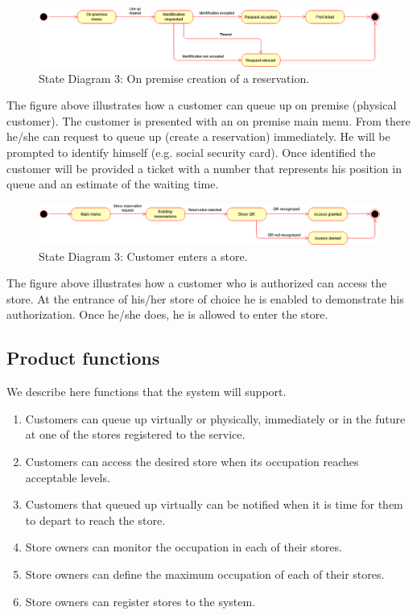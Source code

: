 \begin{figure}[!htb]
	\centering
	\includegraphics[width=\textwidth]{Images/StateDiagram3.png}
	\caption{State Diagram 3: On premise creation of a reservation.}
\end{figure}
The figure above illustrates how a customer can queue up on premise (physical customer). The customer is presented with an on premise main menu. From there he/she can request to queue up (create a reservation) immediately. He will be prompted to identify himself (e.g. social security card). Once identified the customer will be provided a ticket with a number that represents his position in queue and an estimate of the waiting time.

\begin{figure}[!htb]
	\centering
	\includegraphics[width=\textwidth]{Images/StateDiagram4.png}
	\caption{State Diagram 3: Customer enters a store.}
\end{figure}
The figure above illustrates how a customer who is authorized can access the store. At the entrance of his/her store of choice he is enabled to demonstrate his authorization. Once he/she does, he is allowed to enter the store.

\subsection{Product functions}
We describe here functions that the system will support.
\begin{enumerate}
	\item Customers can queue up virtually or physically, immediately or in the future at one of the stores registered to the service.
	\item Customers can access the desired store when its occupation reaches acceptable levels.
	\item Customers that queued up virtually can be notified when it is time for them to depart to reach the store.
	\item Store owners can monitor the occupation in each of their stores.
	\item Store owners can define the maximum occupation of each of their stores.
	\item Store owners can register stores to the system.
\end{enumerate}

